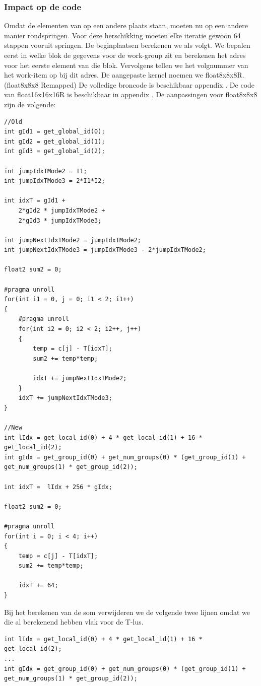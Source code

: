 
\subsubsection{Impact op de code}
Omdat de elementen van \TT{} op een andere plaats staan, moeten nu op een andere manier rondspringen. Voor deze herschikking moeten elke iteratie gewoon 64 stappen vooruit springen. De beginplaatsen berekenen we als volgt. We bepalen eerst in welke blok de gegevens voor de work-group zit en berekenen het adres voor het eerste element van die blok. Vervolgens tellen we het volgnummer van het work-item op bij dit adres. De aangepaste kernel noemen we float8x8x8R. (float8x8x8 Remapped) De volledige broncode is beschikbaar appendix . De code van float16x16x16R is beschikbaar in appendix . De aanpassingen voor float8x8x8 zijn de volgende:
\begin{lstlisting}
//Old
int gId1 = get_global_id(0);
int gId2 = get_global_id(1);
int gId3 = get_global_id(2);

int jumpIdxTMode2 = I1;
int jumpIdxTMode3 = 2*I1*I2;

int idxT = gId1 + 
	2*gId2 * jumpIdxTMode2 +
	2*gId3 * jumpIdxTMode3;

int jumpNextIdxTMode2 = jumpIdxTMode2;
int jumpNextIdxTMode3 = jumpIdxTMode3 - 2*jumpIdxTMode2;

float2 sum2 = 0;

#pragma unroll
for(int i1 = 0, j = 0; i1 < 2; i1++)
{
	#pragma unroll
	for(int i2 = 0; i2 < 2; i2++, j++)
	{
		temp = c[j] - T[idxT];
		sum2 += temp*temp;
		
		idxT += jumpNextIdxTMode2;
	}
	idxT += jumpNextIdxTMode3;
}

//New
int lIdx = get_local_id(0) + 4 * get_local_id(1) + 16 * get_local_id(2);
int gIdx = get_group_id(0) + get_num_groups(0) * (get_group_id(1) + get_num_groups(1) * get_group_id(2));

int idxT =  lIdx + 256 * gIdx;   

float2 sum2 = 0;

#pragma unroll
for(int i = 0; i < 4; i++)
{
	temp = c[j] - T[idxT];
	sum2 += temp*temp;
		
	idxT += 64;
}
\end{lstlisting}
Bij het berekenen van de som verwijderen we de volgende twee lijnen omdat we die al berekenend hebben vlak voor de T-lus.
\begin{lstlisting}
int lIdx = get_local_id(0) + 4 * get_local_id(1) + 16 * get_local_id(2);
...
int gIdx = get_group_id(0) + get_num_groups(0) * (get_group_id(1) + get_num_groups(1) * get_group_id(2));
\end{lstlisting}

